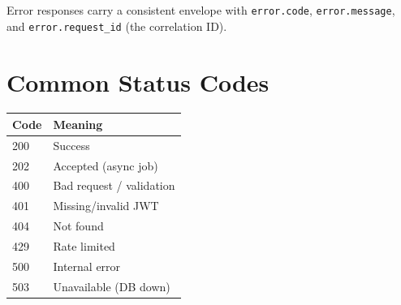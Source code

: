 Error responses carry a consistent envelope with \texttt{error.code},
\texttt{error.message}, and \texttt{error.request\_id} (the correlation ID).

\section{Common Status Codes}

\begin{table}[h]
\centering
\begin{tabular}{@{}ll@{}}
\toprule
\textbf{Code} & \textbf{Meaning} \\
\midrule
200 & Success \\
202 & Accepted (async job) \\
400 & Bad request / validation \\
401 & Missing/invalid JWT \\
404 & Not found \\
429 & Rate limited \\
500 & Internal error \\
503 & Unavailable (DB down) \\
\bottomrule
\end{tabular}
\end{table}
